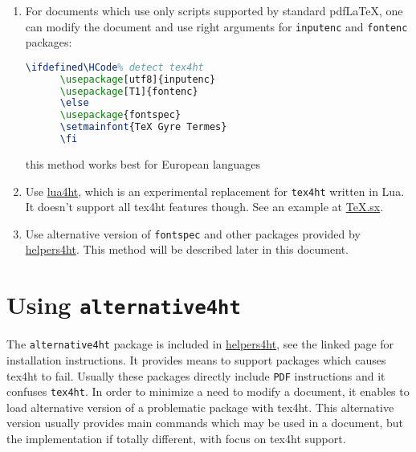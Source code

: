 \documentclass{article}
\begin{document}
\begin{enumerate}
  \item For documents which use only scripts supported by standard pdf\LaTeX,
    one can modify the document and use right arguments for \texttt{inputenc}
    and \texttt{fontenc} packages:

    \begin{lstlisting}[language=TeX]
      \ifdefined\HCode% detect tex4ht
      \usepackage[utf8]{inputenc}
      \usepackage[T1]{fontenc}
      \else
      \usepackage{fontspec}
      \setmainfont{TeX Gyre Termes}
      \fi
    \end{lstlisting}

    this method works best for European languages

  \item Use \href{https://github.com/michal-h21/lua4ht}{lua4ht}, which is an
    experimental replacement for \texttt{tex4ht} written in Lua. It doesn't
    support all tex4ht features though. See an example at
    \href{http://tex.stackexchange.com/a/253889/2891}{TeX.sx}.

  \item Use alternative version of \texttt{fontspec} and other packages
    provided by \href{https://github.com/michal-h21/helpers4ht}{helpers4ht}.
    This method will be described later in this document.


\end{enumerate}

\section{Using \texttt{alternative4ht}}

The \texttt{alternative4ht} package is included in
\href{https://github.com/michal-h21/helpers4ht}{helpers4ht}, see the linked
page for installation instructions. It  provides means to support packages
which causes tex4ht to fail. Usually these packages directly include
\texttt{PDF} instructions and it confuses \texttt{tex4ht}. In order to minimize
a need to modify a document, it enables to load alternative version of a
problematic package with tex4ht. This alternative version usually provides main
commands which may be used in a document, but the implementation if totally
different, with focus on tex4ht support.
\end{document}
